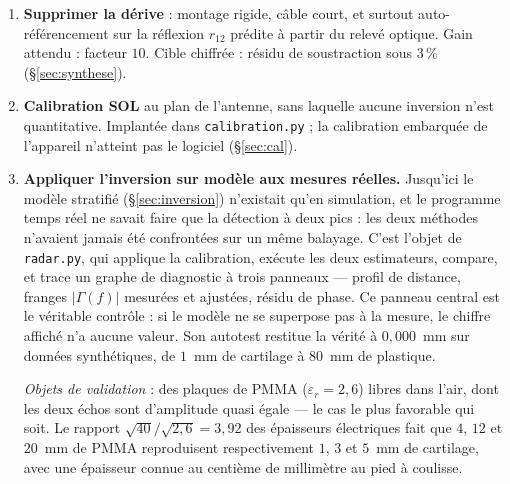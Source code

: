 \documentclass[11pt,a4paper]{article}
\newcommand{\eps}{\varepsilon_r}
\begin{document}
\begin{enumerate}
\item \textbf{Supprimer la dérive} : montage rigide, câble court, et surtout
      auto-référencement sur la réflexion $r_{12}$ prédite à partir du relevé
      optique. Gain attendu : facteur $10$. Cible chiffrée : résidu de
      soustraction sous $3\,\%$ (\S\ref{sec:synthese}).
\item \textbf{Calibration SOL} au plan de l'antenne, sans laquelle aucune
      inversion n'est quantitative. Implantée dans
      \texttt{calibration.py} ; la calibration embarquée de l'appareil
      n'atteint pas le logiciel (\S\ref{sec:cal}).
\item \textbf{Appliquer l'inversion sur modèle aux mesures réelles.} Jusqu'ici
      le modèle stratifié (\S\ref{sec:inversion}) n'existait qu'en simulation,
      et le programme temps réel ne savait faire que la détection à deux pics :
      les deux méthodes n'avaient jamais été confrontées sur un même balayage.
      C'est l'objet de \texttt{radar.py}, qui applique la
      calibration, exécute les deux estimateurs, compare, et trace un graphe de
      diagnostic à trois panneaux --- profil de distance, franges $|\Gamma(f)|$
      mesurées et ajustées, résidu de phase. Ce panneau central est le véritable
      contrôle : si le modèle ne se superpose pas à la mesure, le chiffre
      affiché n'a aucune valeur. Son autotest restitue la vérité à
      $0{,}000$~mm sur données synthétiques, de $1$~mm de cartilage à $80$~mm de
      plastique.

      \emph{Objets de validation} : des plaques de PMMA ($\eps = 2{,}6$) libres
      dans l'air, dont les deux échos sont d'amplitude quasi égale --- le cas le
      plus favorable qui soit. Le rapport $\sqrt{40}/\sqrt{2{,}6} = 3{,}92$ des
      épaisseurs électriques fait que $4$, $12$ et $20$~mm de PMMA reproduisent
      respectivement $1$, $3$ et $5$~mm de cartilage, avec une épaisseur connue
      au centième de millimètre au pied à coulisse.


\end{enumerate}
\end{document}
